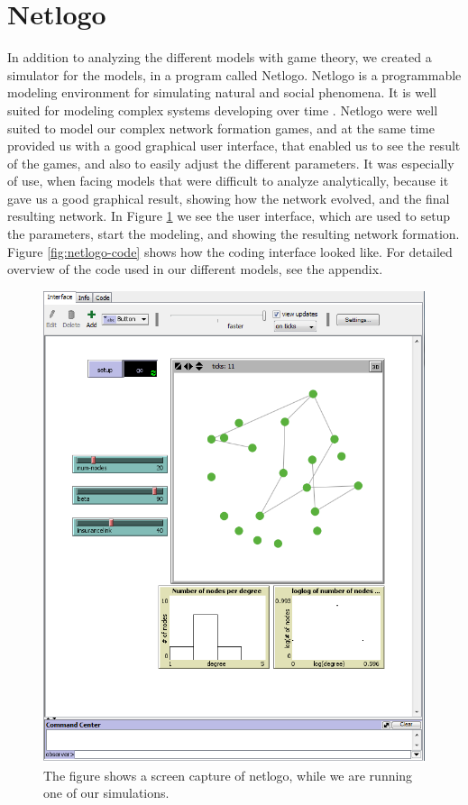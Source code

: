 \section{Netlogo}
In addition to analyzing the different models with game theory, we created a simulator for the models, in a program called Netlogo. Netlogo is a programmable modeling environment for simulating natural and social phenomena. It is well suited for modeling complex systems developing over time \cite{netlogo}.
Netlogo were well suited to model our complex network formation games, and at the same time provided us with a good graphical user interface, that enabled us to see the result of the games, and also to easily adjust the different parameters. It was especially of use, when facing models that were difficult to analyze analytically, because it gave us a good graphical result, showing how the network evolved, and the final resulting network.  
In Figure \ref{fig:netlogo} we see the user interface, which are used to setup the parameters, start the modeling, and showing the resulting network formation. Figure \ref{fig:netlogo-code} shows how the coding interface looked like. For detailed overview of the code used in our different models, see the appendix.
\begin{figure}[h]
\centering
  \includegraphics[width=0.9\linewidth]{../Figures/netlogoexample.png}
  \caption{\label{fig:netlogo} The figure shows a screen capture of netlogo, while we are running one of our simulations.}

\end{figure}
